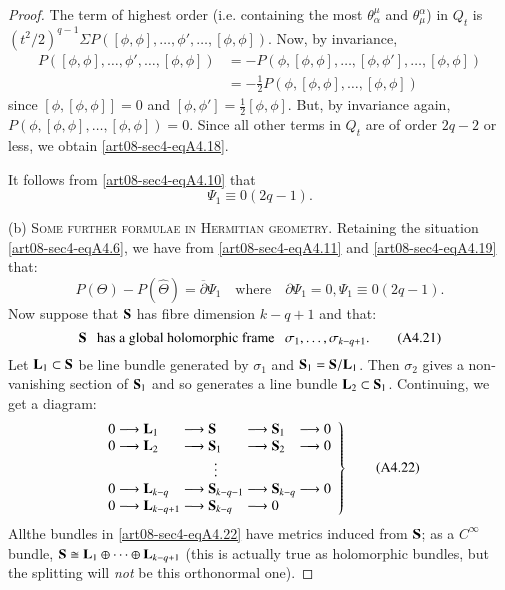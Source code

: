 \begin{proof}
The term of highest order (i.e. containing the most $\theta^{\mu}_{\alpha}$ and $\theta^{\alpha}_{\mu}$) in $Q_{t}$ is $(t^{2}/2)^{q-1}\Sigma P([\phi,\phi],\ldots,\phi',\ldots,[\phi,\phi])$. Now, by invariance,
\begin{align*}
P([\phi,\phi],\ldots,\phi',\ldots,[\phi,\phi]) &= -P(\phi,[\phi,\phi],\ldots,[\phi,\phi'],\ldots,[\phi,\phi])\\[3pt]
&= -\frac{1}{2}P(\phi,[\phi,\phi],\ldots,[\phi,\phi])
\end{align*}
since $[\phi,[\phi,\phi]]=0$ and $[\phi,\phi']=\frac{1}{2}[\phi,\phi]$. But, by invariance again, $P(\phi,[\phi,\phi],\ldots,[\phi,\phi])=0$. Since all other terms in $Q_{t}$ are of order $2q-2$ or less, we obtain \eqref{art08-sec4-eqA4.18}.

It follows from \eqref{art08-sec4-eqA4.10} that
\begin{equation*}
\Psi_{1}\equiv 0(2q-1).\tag{A4.19}\label{art08-sec4-eqA4.19}
\end{equation*}

(b) \textsc{Some further formulae in Hermitian geometry.} Retaining the situation \eqref{art08-sec4-eqA4.6}, we have from \eqref{art08-sec4-eqA4.11} and \eqref{art08-sec4-eqA4.19} that:
\begin{equation*}
P(\Theta)-P(\widehat{\Theta})=\overline{\partial}\Psi_{1}\text{~~ where~~ } \partial\Psi_{1}=0,\Psi_{1}\equiv 0(2q-1).\tag{A4.20}\label{art08-sec4-eqA4.20}
\end{equation*}
Now suppose that $\mathbf{S}$ has fibre dimension $k-q+1$ and that:
\begin{equation*}
\mathbf{S}\text{~~ has a global holomorphic frame~~ } \sigma_{1},\ldots,\sigma_{k-q+1}.\tag{A4.21} \label{art08-sec4-eqA4.21}
\end{equation*}
Let $\mathbf{L}_{1}\subset \mathbf{S}$ be line bundle generated by $\sigma_{1}$ and $\mathbf{S}_{1}=\mathbf{S}/\mathbf{L}_{1}$. Then $\sigma_{2}$ gives a non-vanishing section of $\mathbf{S}_{1}$ and so generates a line bundle $\mathbf{L}_{2}\subset \mathbf{S}_{1}$. Continuing, we get a diagram:
\begin{equation*}
\left.
\begin{array}{l@{\;}l@{\;}l@{\;}l}
0\longrightarrow \bfL_{1} & \longrightarrow \bfS & \longrightarrow \bfS_{1} & \longrightarrow 0\\
0\longrightarrow \bfL_{2} & \longrightarrow \bfS_{1} & \longrightarrow \bfS_{2} & \longrightarrow 0\\
 & \multicolumn{1}{c}{$\vdots$} & & \\
0\longrightarrow \bfL_{k-q} & \longrightarrow \bfS_{k-q-1} & \longrightarrow \bfS_{k-q} & \longrightarrow 0\\
0\longrightarrow \bfL_{k-q+1} & \longrightarrow \bfS_{k-q} & \longrightarrow 0 &
\end{array}
\right\}\tag{A4.22}\label{art08-sec4-eqA4.22}
\end{equation*}
All\pageoriginale the bundles in \eqref{art08-sec4-eqA4.22} have metrics induced from $\mathbf{S}$; as a $C^{\infty}$ bundle, $\mathbf{S}\cong \mathbf{L}_{1}\oplus\cdots\oplus \mathbf{L}_{k-q+1}$ (this is actually true as holomorphic bundles, but the splitting will {\em not} be this orthonormal one).


\end{proof}
